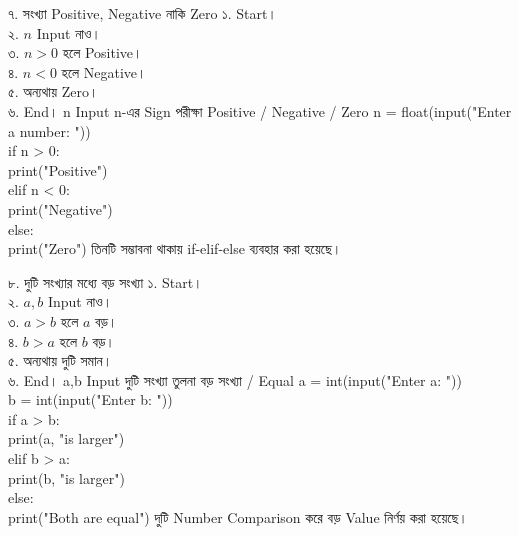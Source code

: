 \exerciseTable
{৭. সংখ্যা Positive, Negative নাকি Zero}
{
১. Start।\\
২. \(n\) Input নাও।\\
৩. \(n>0\) হলে Positive।\\
৪. \(n<0\) হলে Negative।\\
৫. অন্যথায় Zero।\\
৬. End।
}
{
\linearflow
{n Input}
{n-এর Sign পরীক্ষা}
{Positive / Negative / Zero}
}
{
n = float(input("Enter a number: "))\\[0.5mm]
if n > 0:\\
\hspace*{4mm}print("Positive")\\
elif n < 0:\\
\hspace*{4mm}print("Negative")\\
else:\\
\hspace*{4mm}print("Zero")
}
{
তিনটি সম্ভাবনা থাকায়
\textenglish{\ttfamily if-elif-else}
ব্যবহার করা হয়েছে।
}


\exerciseTable
{৮. দুটি সংখ্যার মধ্যে বড় সংখ্যা}
{
১. Start।\\
২. \(a,b\) Input নাও।\\
৩. \(a>b\) হলে \(a\) বড়।\\
৪. \(b>a\) হলে \(b\) বড়।\\
৫. অন্যথায় দুটি সমান।\\
৬. End।
}
{
\linearflow
{a,b Input}
{দুটি সংখ্যা তুলনা}
{বড় সংখ্যা / Equal}
}
{
a = int(input("Enter a: "))\\
b = int(input("Enter b: "))\\[0.5mm]
if a > b:\\
\hspace*{4mm}print(a, "is larger")\\
elif b > a:\\
\hspace*{4mm}print(b, "is larger")\\
else:\\
\hspace*{4mm}print("Both are equal")
}
{
দুটি Number Comparison করে বড় Value নির্ণয় করা হয়েছে।
}


